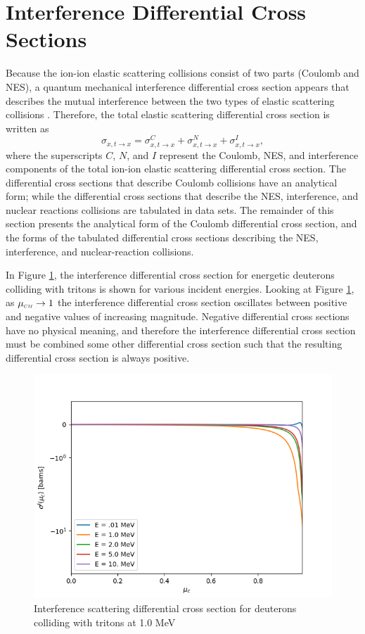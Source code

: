 \section{Interference Differential Cross Sections}
Because the ion-ion elastic scattering collisions consist of two parts (Coulomb and NES), a quantum mechanical interference differential cross section appears that describes the mutual interference between the two types of elastic scattering collisions \cite{Devaney-1971}. Therefore, the total elastic scattering differential cross section is written as
\begin{equation}
    \sigma_{x,t \rightarrow x} = \sigma_{x,t \rightarrow x}^C + \sigma_{x,t \rightarrow x}^N + \sigma_{x,t \rightarrow x}^I,
\end{equation}
where the superscripts $C$, $N$, and $I$ represent the Coulomb, NES, and interference components of the total ion-ion elastic scattering differential cross section. The differential cross sections that describe Coulomb collisions have an analytical form; while the differential cross sections that describe the NES, interference, and nuclear reactions collisions are tabulated in data sets. The remainder of this section presents the analytical form of the Coulomb differential cross section, and the forms of the tabulated differential cross sections describing the NES, interference, and nuclear-reaction collisions.

In Figure \ref{fig:sig_i}, the interference differential cross section for energetic deuterons colliding with tritons is shown for various incident energies. Looking at Figure \ref{fig:sig_i}, as $\mucm \rightarrow 1$ the interference differential cross section oscillates between positive and negative values of increasing magnitude. Negative differential cross sections have no physical meaning, and therefore the interference differential cross section must be combined some other differential cross section such that the resulting differential cross section is always positive.

\begin{figure}[!htb]
    \centering
    \includegraphics[scale=0.75]{../figures/proposed_work/sig_i_dt.png}
    \caption{Interference scattering differential cross section for deuterons colliding with tritons at 1.0 MeV}
    \label{fig:sig_i}
\end{figure}